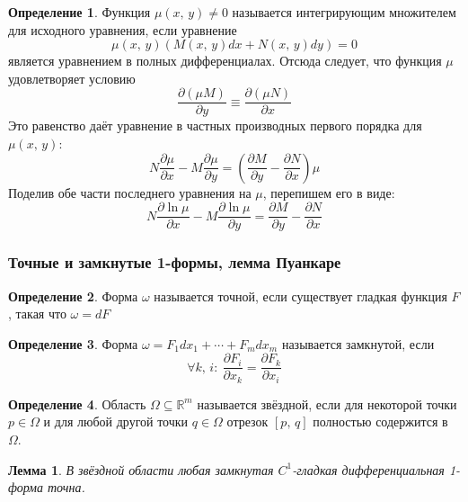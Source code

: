 \documentclass[a4paper,12pt]{article}
\theoremstyle{plain}
\newtheorem{lemma}{Лемма}[section]
\theoremstyle{definition}
\newtheorem{definition}{Определение}[section]
\theoremstyle{remark}
\begin{document}
\begin{definition}
	Функция $\mu(x,\,y) \neq 0$ называется интегрирующим множителем для исходного уравнения, если уравнение
	\[\mu(x,\,y)(M(x,\,y)dx + N(x,\,y)dy) = 0\]
	является уравнением в полных дифференциалах. Отсюда следует, что функция $\mu$ удовлетворяет условию
	\[\frac{\partial(\mu M)}{\partial y} \equiv \frac{\partial(\mu N)}{\partial x}\]
	Это равенство даёт уравнение в частных производных первого порядка для $\mu(x,\,y):$
	\[N\frac{\partial\mu}{\partial x} - M\frac{\partial\mu}{\partial y} = \left(\frac{\partial M}{\partial y} - \frac{\partial N}{\partial x}\right)\mu\]
	Поделив обе части последнего уравнения на $\mu$, перепишем его в виде:
	\[N\frac{\partial \ln\mu}{\partial x} - M\frac{\partial \ln\mu}{\partial y} = \frac{\partial M}{\partial y} - \frac{\partial N}{\partial x}\]
\end{definition}

\subsubsection*{Точные и замкнутые 1-формы, лемма Пуанкаре}
\begin{definition}
	Форма $\omega$ называется точной, если существует гладкая функция $F$, такая что $\omega = dF$
\end{definition}

\begin{definition}
	Форма $\omega = F_1dx_1 + \cdots + F_mdx_m$ называется замкнутой, если
	\[\forall k,\,i:\: \frac{\partial F_i}{\partial x_k} = \frac{\partial F_k}{\partial x_i}\]
\end{definition}

\begin{definition}
	Область $\Omega \subseteq \mathbb{R}^m$ называется звёздной, если для некоторой точки $p \in \Omega$ и для любой другой точки $q \in \Omega$ отрезок $[p,\, q]$ полностью содержится в $\Omega$.
\end{definition}

\begin{lemma}
	В звёздной области любая замкнутая $C^1$-гладкая дифференциальная 1-форма точна.
\end{lemma}
\end{document}
